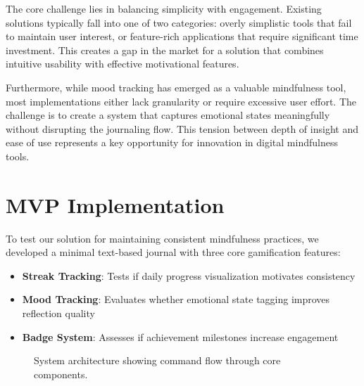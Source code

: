 \documentclass{article} %
\begin{document}
The core challenge lies in balancing simplicity with engagement. Existing solutions typically fall into one of two categories: overly simplistic tools that fail to maintain user interest, or feature-rich applications that require significant time investment. This creates a gap in the market for a solution that combines intuitive usability with effective motivational features.

Furthermore, while mood tracking has emerged as a valuable mindfulness tool, most implementations either lack granularity or require excessive user effort. The challenge is to create a system that captures emotional states meaningfully without disrupting the journaling flow. This tension between depth of insight and ease of use represents a key opportunity for innovation in digital mindfulness tools.

\section{MVP Implementation}
\label{sec:mvp_implementation}

To test our solution for maintaining consistent mindfulness practices, we developed a minimal text-based journal with three core gamification features:

\begin{itemize}
    \item \textbf{Streak Tracking}: Tests if daily progress visualization motivates consistency
    \item \textbf{Mood Tracking}: Evaluates whether emotional state tagging improves reflection quality
    \item \textbf{Badge System}: Assesses if achievement milestones increase engagement
\end{itemize}

\begin{figure}[h]
\centering
{}
\caption{System architecture showing command flow through core components.}
\label{fig:architecture}
\end{figure}
\end{document}
